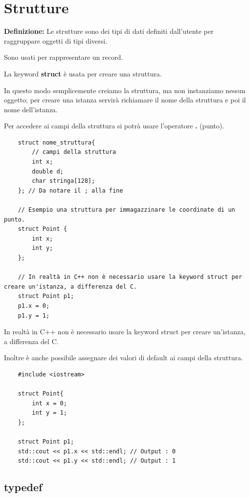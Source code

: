 \newpage

\section{Strutture}

\textsf{\small \textbf{Definizione: } Le strutture sono dei tipi di dati definiti dall'utente per raggruppare oggetti di tipi diversi.} 

\textsf{\small Sono usati per rappresentare un record.}

\textsf{\small La keyword \textbf{struct} è usata per creare una struttura.}

\textsf{\small In questo modo semplicemente creiamo la struttura, ma non instanziamo nessun oggetto; per creare una istanza servirà richiamare il nome della struttura e poi il nome dell'istanza.}

\textsf{\small Per accedere ai campi della struttura si potrà usare l'operatore \textbf{.} (punto).}

\begin{lstlisting}
	struct nome_struttura{
		// campi della struttura
		int x;
		double d;
		char stringa[128];
	}; // Da notare il ; alla fine

	// Esempio una struttura per immagazzinare le coordinate di un punto.
	struct Point {
		int x;
		int y;
	};

	// In realtà in C++ non è necessario usare la keyword struct per creare un'istanza, a differenza del C.
	struct Point p1;
	p1.x = 0;
	p1.y = 1;
\end{lstlisting}

\textsf{\small In realtà in C++ non è necessario usare la keyword struct per creare un'istanza, a differenza del C.}

\textsf{\small Inoltre è anche possibile assegnare dei valori di default ai campi della struttura.} \\

\begin{lstlisting}
	#include <iostream>
	
	struct Point{
		int x = 0;
		int y = 1;
	};

	struct Point p1;
	std::cout << p1.x << std::endl; // Output : 0
	std::cout << p1.y << std::endl; // Output : 1
\end{lstlisting}

\subsection{typedef}

